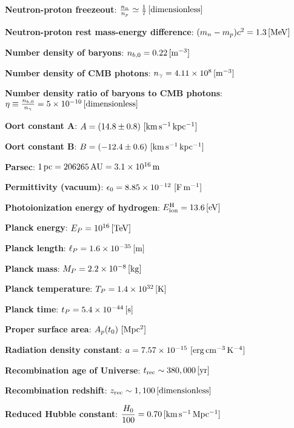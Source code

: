 \documentclass[a4paper,10pt]{article}
\begin{document}
{\noindent}\textbf{Neutron-proton freezeout}: $\frac{n_n}{n_p} \simeq \frac{1}{7}\,[{\rm dimensionless}]$

{\noindent}\textbf{Neutron-proton rest mass-energy difference}: $(m_n-m_p)c^2 = 1.3\,[{\rm MeV}]$

{\noindent}\textbf{Number density of baryons}: $n_{b,0} = 0.22\,[{\rm m^{-3}}]$

{\noindent}\textbf{Number density of CMB photons}: $n_\gamma= 4.11\times10^8\,[{\rm m^{-3}}]$

{\noindent}\textbf{Number density ratio of baryons to CMB photons}: $\eta \equiv \frac{n_{b,0}}{n_\gamma} = 5\times10^{-10}\,[{\rm dimensionless}]$

{\noindent}\textbf{Oort constant A}: $A = (14.8\pm0.8) ~ [{\rm km\,s^{-1}\,kpc^{-1}}]$

{\noindent}\textbf{Oort constant B}: $B = (-12.4\pm0.6) ~ [{\rm km\,s^{-1}\,kpc^{-1}}]$

{\noindent}\textbf{Parsec}: $1\,{\rm pc} = 206265\,{\rm AU} = 3.1\times10^{16}\,{\rm m}$

{\noindent}\textbf{Permittivity (vacuum)}: $\epsilon_0 = 8.85\times10^{-12} ~ [{\rm F\,m^{-1}}]$

{\noindent}\textbf{Photoionization energy of hydrogen}: $E^\mathrm{H}_\mathrm{ion} = 13.6\,[{\rm eV}]$

{\noindent}\textbf{Planck energy}: $E_P = 10^{16}\,[{\rm TeV}]$

{\noindent}\textbf{Planck length}: $\ell_P = 1.6\times10^{-35}\,[{\rm m}]$

{\noindent}\textbf{Planck mass}: $M_P = 2.2\times10^{-8}\,[{\rm kg}]$

{\noindent}\textbf{Planck temperature}: $T_P = 1.4\times10^{32}\,[{\rm K}]$

{\noindent}\textbf{Planck time}: $t_P = 5.4\times10^{-44}\,[{\rm s}]$

{\noindent}\textbf{Proper surface area}: $A_p(t_0) ~ [{\rm Mpc^2}]$

{\noindent}\textbf{Radiation density constant}: $a=7.57\times10^{-15} ~ [{\rm erg\,cm^{-3}\,K^{-4}}]$

{\noindent}\textbf{Recombination age of Universe}: $t_\mathrm{rec} \sim 380,000\,[{\rm yr}]$

{\noindent}\textbf{Recombination redshift}: $z_\mathrm{rec}\sim1,100\,[{\rm dimensionless}]$

{\noindent}\textbf{Reduced Hubble constant}: $\dfrac{H_0}{100} = 0.70\,[{\rm km\,s^{-1}\,Mpc^{-1}}]$
\end{document}
